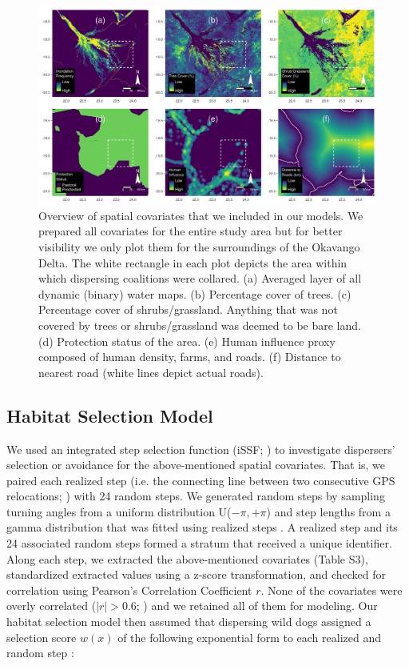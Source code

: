 \documentclass[abstract=on,10pt,a4paper,bibliography=totocnumbered]{article}
\begin{document}
\begin{figure}[h]
  \begin{center}
    \includegraphics[width = \textwidth]{99_Covariates.pdf}
    \caption{Overview of spatial covariates that we included in our models. We
    prepared all covariates for the entire study area but for better visibility
    we only plot them for the surroundings of the Okavango Delta. The white
    rectangle in each plot depicts the area within which dispersing coalitions
    were collared. (a) Averaged layer of all dynamic (binary) water maps. (b)
    Percentage cover of trees. (c) Percentage cover of shrubs/grassland.
    Anything that was not covered by trees or shrubs/grassland was deemed to be
    bare land. (d) Protection status of the area. (e) Human influence proxy
    composed of human density, farms, and roads. (f) Distance to nearest road
    (white lines depict actual roads).}
    \label{Covariates}
  \end{center}
\end{figure}

\subsection{Habitat Selection Model}
We used an integrated step selection function (iSSF; \citealp{Avgar.2016}) to
investigate dispersers' selection or avoidance for the above-mentioned spatial
covariates. That is, we paired each realized step (i.e. the connecting line
between two consecutive GPS relocations; \citealp{Turchin.1998}) with 24 random
steps. We generated random steps by sampling turning angles from a uniform
distribution U(\(-\pi, +\pi\)) and step lengths from a gamma distribution that
was fitted using realized steps \citep{Avgar.2016}. A realized step and its 24
associated random steps formed a stratum that received a unique identifier.
Along each step, we extracted the above-mentioned covariates (Table S3),
standardized extracted values using a z-score transformation, and checked for
correlation using Pearson's Correlation Coefficient \(r\). None of the
covariates were overly correlated (\(|r| > 0.6\); \citealp{Latham.2011}) and we
retained all of them for modeling. Our habitat selection model then assumed that
dispersing wild dogs assigned a selection score \(w(x)\) of the following
exponential form to each realized and random step \citep{Fortin.2005}:
\end{document}
